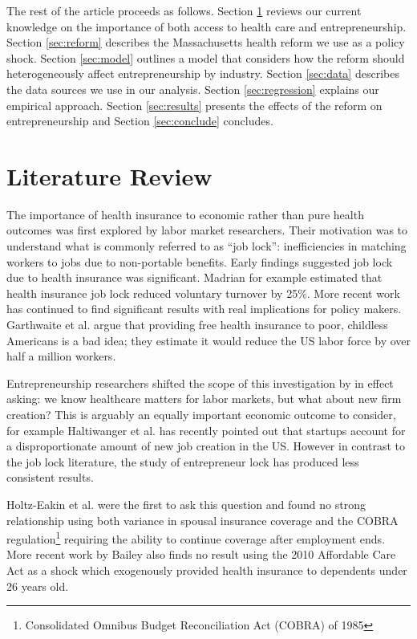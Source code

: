 \documentclass[12pt]{article}
\begin{document}
The rest of the article proceeds as follows. Section \ref{sec:review} reviews our current knowledge on the importance of both access to health care and entrepreneurship. Section \ref{sec:reform} describes the Massachusetts health reform we use as a policy shock. Section \ref{sec:model} outlines a model that considers how the reform should heterogeneously affect entrepreneurship by industry. Section \ref{sec:data} describes the data sources we use in our analysis. Section \ref{sec:regression} explains our empirical approach. Section \ref{sec:results} presents the effects of the reform on entrepreneurship and Section \ref{sec:conclude} concludes. 

\section{Literature Review}
\label{sec:review}

The importance of health insurance to economic rather than pure health outcomes was first explored by labor market researchers. Their motivation was to understand what is commonly referred to as ``job lock'': inefficiencies in matching workers to jobs due to non-portable benefits. Early findings suggested job lock due to health insurance was significant. Madrian \cite{madrian} for example estimated that health insurance job lock reduced voluntary turnover by 25\%. More recent work has continued to find significant results with real implications for policy makers. Garthwaite et al. \cite{garthwaite} argue that providing free health insurance to poor, childless Americans is a bad idea; they estimate it would reduce the US labor force by over half a million workers. 

Entrepreneurship researchers shifted the scope of this investigation by in effect asking: we know healthcare matters for labor markets, but what about new firm creation? This is arguably an equally important economic outcome to consider, for example Haltiwanger et al. \cite{haltiwanger} has recently pointed out that startups account for a disproportionate amount of new job creation in the US. However in contrast to the job lock literature, the study of entrepreneur lock has produced less consistent results. 

Holtz-Eakin et al. \cite{holtz_health} were the first to ask this question and found no strong relationship using both variance in spousal insurance coverage and the COBRA regulation\footnote{Consolidated Omnibus Budget Reconciliation Act (COBRA) of 1985} requiring the ability to continue coverage after employment ends. More recent work by Bailey \cite{bailey} also finds no result using the 2010 Affordable Care Act as a shock which exogenously provided health insurance to dependents under 26 years old. 
\end{document}
